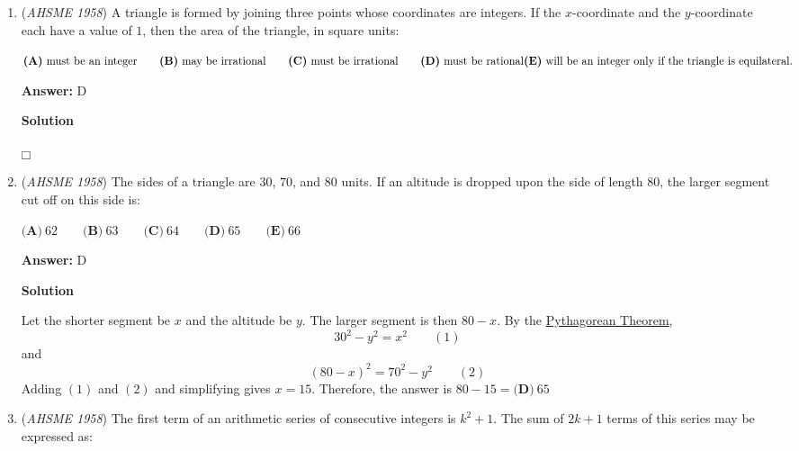 \begin{enumerate}
 $\textbf{(A)}\ \frac{3}{5} < x \le 2\qquad  \textbf{(B)}\ \frac{3}{5} \le x \le 2\qquad  \textbf{(C)}\ 0 < x \le 2\qquad \\ \textbf{(D)}\ 0 \le x \le 2\qquad  \textbf{(E)}\ -2 \le x \le 2$

 \textbf{Answer: }A



\textbf{Solution}

$\fbox{}$



	\item (\textit{AHSME 1958}) A triangle is formed by joining three points whose coordinates are integers. If the $x$-coordinate and the $y$-coordinate each have a value of $1$, then the area of the triangle, in square units:


 $\textbf{(A)}\ \text{must be an integer}\qquad  \textbf{(B)}\ \text{may be irrational}\qquad  \textbf{(C)}\ \text{must be irrational}\qquad  \textbf{(D)}\ \text{must be rational}\qquad \\ \textbf{(E)}\ \text{will be an integer only if the triangle is equilateral.}$

 \textbf{Answer: }D



\textbf{Solution}

$\fbox{}$



	\item (\textit{AHSME 1958}) The sides of a triangle are $30$, $70$, and $80$ units. If an altitude is dropped upon the side of length $80$, the larger segment cut off on this side is:


 $\textbf{(A)}\ 62\qquad  \textbf{(B)}\ 63\qquad  \textbf{(C)}\ 64\qquad  \textbf{(D)}\ 65\qquad  \textbf{(E)}\ 66$

 \textbf{Answer: }D



\textbf{Solution}

Let the shorter segment be $x$ and the altitude be $y$. The larger segment is then $80-x$.  By the \href{https://artofproblemsolving.com/wiki/index.php?title=Pythagorean\_Theorem}{Pythagorean Theorem}, 
 \[30^2-y^2=x^2 \qquad(1)\]and 
 \[(80-x)^2=70^2-y^2 \qquad(2)\]Adding $(1)$ and $(2)$ and simplifying gives $x=15$. Therefore, the answer is $80-15=\boxed{\textbf{(D)}~65}$



	\item (\textit{AHSME 1958}) The first term of an arithmetic series of consecutive integers is $k^2 + 1$. The sum of $2k + 1$ terms of this series may be expressed as:



\end{enumerate}
